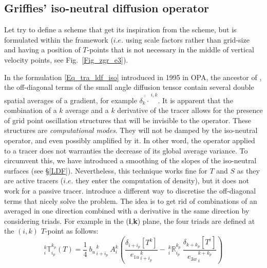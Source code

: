 \subsection{Griffies' iso-neutral diffusion operator}

Let try to define a scheme that get its inspiration from the \citet{Griffies_al_JPO98}
scheme, but is formulated within the \NEMO framework ($i.e.$ using scale 
factors rather than grid-size and having a position of $T$-points that is not 
necessary in the middle of vertical velocity points, see Fig.~\ref{Fig_zgr_e3}).

In the formulation \eqref{Eq_tra_ldf_iso} introduced in 1995 in OPA, the ancestor of \NEMO, 
the off-diagonal terms of the small angle diffusion tensor contain several double 
spatial averages of a gradient, for example $\overline{\overline{\delta_k \cdot}}^{\,i,k}$. 
It is apparent that the combination of a $k$ average and a $k$ derivative of the tracer 
allows for the presence of grid point oscillation structures that will be invisible 
to the operator. These structures are \textit{computational modes}. They
will not be damped by the iso-neutral operator, and even possibly amplified by it. 
In other word, the operator applied to a tracer does not warranties the decrease of 
its global average variance. To circumvent this, we have introduced a smoothing of 
the slopes of the iso-neutral surfaces (see \S\ref{LDF}). Nevertheless, this technique 
works fine for $T$ and $S$ as they are active tracers ($i.e.$ they enter the computation 
of density), but it does not work for a passive tracer.   \citep{Griffies_al_JPO98} introduce 
a different way to discretise the off-diagonal terms that nicely solve the problem. 
The idea is to get rid of combinations of an averaged in one direction combined 
with a derivative in the same direction by considering triads. For example in the 
(\textbf{i},\textbf{k}) plane, the four triads are defined at the $(i,k)$ $T$-point as follows:
\begin{equation} \label{Gf_triads}
_i^k \mathbb{T}_{i_p}^{k_p} (T)
= \frac{1}{4} \ {b_u}_{\,i+i_p}^{\,k}  \  A_i^k  	\left(  
                                                     \frac{ \delta_{i + i_p}[T^k] }{ {e_{1u}}_{\,i + i_p}^{\,k} } 
-\ {_i^k \mathbb{R}_{i_p}^{k_p}} \ \frac{ \delta_{k+k_p} [T^i] }{ {e_{3w}}_{\,i}^{\,k+k_p} } 
									  \right)
\end{equation}
